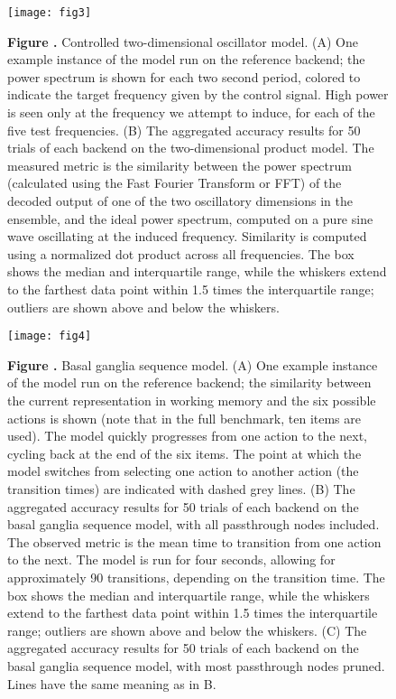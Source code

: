 \documentclass{frontiersSCNS}
\begin{document}
\begin{figure}[!ht]
\begin{center}
  \texttt{[image: fig3]}
\end{center}
\textbf{\label{fig:03} Figure .}
       {Controlled two-dimensional oscillator model. (A) One example
         instance of the model run on the reference backend;
         the power spectrum is shown for each two second period,
         colored to indicate the target frequency given by the control signal.
         High power is seen only at the frequency we attempt to induce,
         for each of the five test frequencies.
         (B) The aggregated accuracy results for 50 trials of
         each backend on the
         two-dimensional product model. The measured metric is the similarity
         between the power spectrum (calculated using the Fast Fourier
         Transform or FFT) of the decoded output of one of the two oscillatory
         dimensions in the ensemble, and the ideal power spectrum,
         computed on a pure sine wave oscillating at the induced frequency.
         Similarity is computed using a normalized dot product across
         all frequencies. The box shows the median and
         interquartile range, while the whiskers extend to the farthest
         data point within 1.5 times the interquartile range;
         outliers are shown above and below the whiskers.}
\end{figure}

\begin{figure}[!ht]
\begin{center}
  \texttt{[image: fig4]}
\end{center}
\textbf{\label{fig:04} Figure .}
       {Basal ganglia sequence model. (A) One example instance
         of the model run on the reference backend; the similarity between
         the current representation in working memory and the six possible
         actions is shown (note that in the full benchmark, ten items are
         used). The model quickly progresses from one action to the next,
         cycling back at the end of the six items. The point at which the
         model switches from selecting one action to another action
         (the transition times) are indicated with dashed grey lines.
         (B) The aggregated accuracy results for 50 trials of
         each backend on the
         basal ganglia sequence model, with all passthrough nodes included.
         The observed metric is the mean
         time to transition from one action to the next. The model is run
         for four seconds, allowing for approximately 90 transitions, depending
         on the transition time. The box shows the median and
         interquartile range, while the whiskers extend to the farthest
         data point within 1.5 times the interquartile range;
         outliers are shown above and below the whiskers.
         (C) The aggregated accuracy results for 50 trials of
         each backend on the
         basal ganglia sequence model, with most passthrough nodes pruned.
         Lines have the same meaning as in B.}
\end{figure}
\end{document}
